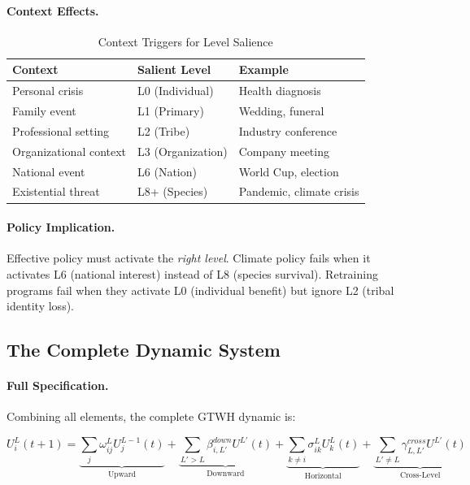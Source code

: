 \paragraph{Context Effects.}
\begin{table}[htbp]
\centering
\caption{Context Triggers for Level Salience}
\label{tab:gtwh-salience}
\renewcommand{\arraystretch}{1.3}
\begin{tabular}{@{}lll@{}}
\toprule
\textbf{Context} & \textbf{Salient Level} & \textbf{Example} \\
\midrule
Personal crisis & L0 (Individual) & Health diagnosis \\
Family event & L1 (Primary) & Wedding, funeral \\
Professional setting & L2 (Tribe) & Industry conference \\
Organizational context & L3 (Organization) & Company meeting \\
National event & L6 (Nation) & World Cup, election \\
Existential threat & L8+ (Species) & Pandemic, climate crisis \\
\bottomrule
\end{tabular}
\end{table}

\paragraph{Policy Implication.}
Effective policy must activate the \textit{right level}. Climate policy 
fails when it activates L6 (national interest) instead of L8 (species survival). 
Retraining programs fail when they activate L0 (individual benefit) but 
ignore L2 (tribal identity loss).

\subsection{The Complete Dynamic System}

\paragraph{Full Specification.}
Combining all elements, the complete GTWH dynamic is:

\begin{tcolorbox}[colback=blue!5!white, colframe=blue!75!black, title=The GTWH Master Equation]
\begin{equation}
\boxed{
U^L_i(t+1) = \underbrace{\sum_{j} \omega^L_{ij} U^{L-1}_j(t)}_{\text{Upward}} + 
\underbrace{\sum_{L'>L} \beta^{down}_{i,L'} U^{L'}(t)}_{\text{Downward}} + 
\underbrace{\sum_{k \neq i} \sigma^L_{ik} U^L_k(t)}_{\text{Horizontal}} + 
\underbrace{\sum_{L' \neq L} \gamma^{cross}_{L,L'} U^{L'}(t)}_{\text{Cross-Level}}
}
\end{equation}
\end{tcolorbox}

